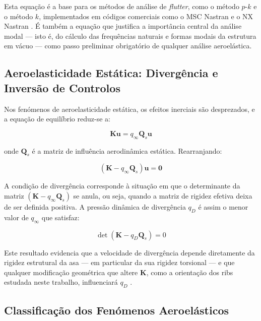 \documentclass[11pt,twoside,a4paper]{report}
\begin{document}
Esta equação é a base para os métodos de análise de \textit{flutter}, como o método $p$-$k$ e o método $k$, implementados em códigos comerciais como o MSC Nastran e o NX Nastran \cite{Nastran2014}. É também a equação que justifica a importância central da análise modal --- isto é, do cálculo das frequências naturais e formas modais da estrutura em vácuo --- como passo preliminar obrigatório de qualquer análise aeroelástica.

\subsection{Aeroelasticidade Estática: Divergência e Inversão de 
Controlos}

Nos fenómenos de aeroelasticidade estática, os efeitos inerciais são desprezados, e a equação de equilíbrio reduz-se a:

\begin{equation}
    \mathbf{K}\mathbf{u} = q_\infty \mathbf{Q}_s \mathbf{u}
    \label{eq:static_aero}
\end{equation}

\noindent onde $\mathbf{Q}_s$ é a matriz de influência aerodinâmica estática. Rearranjando:

\begin{equation}
    \left( \mathbf{K} - q_\infty \mathbf{Q}_s \right) \mathbf{u} = 
    \mathbf{0}
    \label{eq:divergencia}
\end{equation}

A condição de divergência corresponde à situação em que o determinante da matriz $\left( \mathbf{K} - q_\infty \mathbf{Q}_s \right)$ se anula, ou seja, quando a matriz de rigidez efetiva deixa de ser definida positiva. A pressão dinâmica de divergência $q_D$ é assim o menor valor de $q_\infty$ que satisfaz:

\begin{equation}
    \det\left( \mathbf{K} - q_D \mathbf{Q}_s \right) = 0
    \label{eq:qD}
\end{equation}

Este resultado evidencia que a velocidade de divergência depende diretamente da rigidez estrutural da asa --- em particular da sua rigidez torsional --- e que qualquer modificação geométrica que altere $\mathbf{K}$, como a orientação dos ribs estudada neste trabalho, influenciará $q_D$ \cite{Bisplinghoff1996}.

\subsection{Classificação dos Fenómenos Aeroelásticos}
\end{document}
